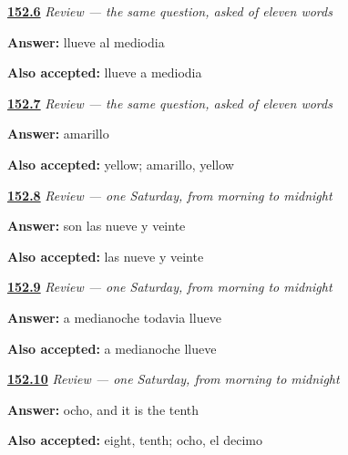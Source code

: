\noindent\begin{minipage}[t]{\linewidth}
\raggedright
\hyperlink{review-ES-C40-repaso-palabras-con-historia-llueve}{\textbf{152.6}} \emph{Review — the same question, asked of eleven words}\par
\small \textbf{Answer:} llueve al mediodia\par
\footnotesize \textbf{Also accepted:} llueve a mediodia
\end{minipage}\par\medskip

\noindent\begin{minipage}[t]{\linewidth}
\raggedright
\hyperlink{review-ES-C40-repaso-palabras-con-historia-amarillo}{\textbf{152.7}} \emph{Review — the same question, asked of eleven words}\par
\small \textbf{Answer:} amarillo\par
\footnotesize \textbf{Also accepted:} yellow; amarillo, yellow
\end{minipage}\par\medskip

\noindent\begin{minipage}[t]{\linewidth}
\raggedright
\hyperlink{review-ES-C40-repaso-un-sabado-de-octubre-hora}{\textbf{152.8}} \emph{Review — one Saturday, from morning to midnight}\par
\small \textbf{Answer:} son las nueve y veinte\par
\footnotesize \textbf{Also accepted:} las nueve y veinte
\end{minipage}\par\medskip

\noindent\begin{minipage}[t]{\linewidth}
\raggedright
\hyperlink{review-ES-C40-repaso-un-sabado-de-octubre-lluvia}{\textbf{152.9}} \emph{Review — one Saturday, from morning to midnight}\par
\small \textbf{Answer:} a medianoche todavia llueve\par
\footnotesize \textbf{Also accepted:} a medianoche llueve
\end{minipage}\par\medskip

\noindent\begin{minipage}[t]{\linewidth}
\raggedright
\hyperlink{review-ES-C40-repaso-un-sabado-de-octubre-ocho}{\textbf{152.10}} \emph{Review — one Saturday, from morning to midnight}\par
\small \textbf{Answer:} ocho, and it is the tenth\par
\footnotesize \textbf{Also accepted:} eight, tenth; ocho, el decimo
\end{minipage}\par\medskip

